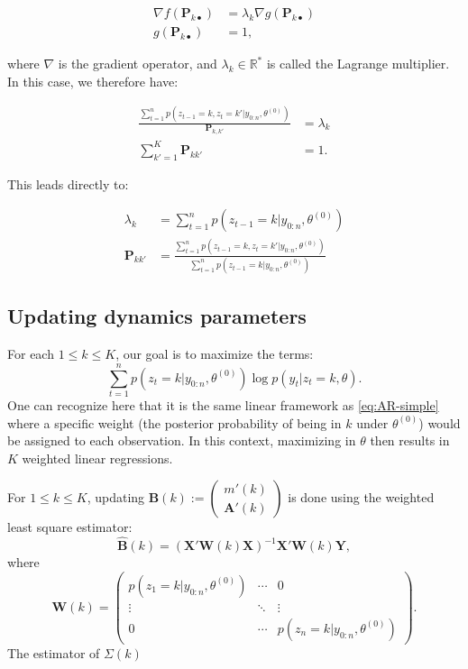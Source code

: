 \documentclass[]{book}
\begin{document}
\begin{align*}
\nabla f(\mathbf{P}_{k\bullet}) &= \lambda_k \nabla g(\mathbf{P}_{k\bullet})\\
g(\mathbf{P}_{k\bullet}) &= 1,
\end{align*}

where \(\nabla\) is the gradient operator, and
\(\lambda_k \in \mathbb{R}^*\) is called the Lagrange multiplier. In
this case, we therefore have:

\begin{align*}
\frac{\sum_{t = 1}^n p(z_{t-1} = k, z_{t} = k'\vert y_{0:n}, \theta^{(0)})}{\mathbf{P}_{k,k'}} &= \lambda_k \\
\sum_{k' = 1}^K{\mathbf{P}_{kk'}} &= 1.
\end{align*}

This leads directly to:

\begin{align*}
\lambda_k &= \sum_{t = 1}^n p(z_{t - 1} = k \vert y_{0:n}, \theta^{(0)}) \\
\mathbf{P}_{kk'} &= \frac{\sum_{t = 1}^n p(z_{t - 1} = k, z_{t} = k'\vert y_{0:n}, \theta^{(0)}) }{\sum_{t = 1}^n p(z_{t - 1} = k \vert y_{0:n}, \theta^{(0)})}
\end{align*}

\subsection*{Updating dynamics
parameters}\label{updating-dynamics-parameters}

For each \(1\leq k \leq K\), our goal is to maximize the terms:
\[\sum_{t = 1}^n p(z_t = k\vert y_{0:n}, \theta^{(0)}) \log p(y_{t} \vert z_{t} = k, \theta).\]
One can recognize here that it is the same linear framework as
\eqref{eq:AR-simple} where a specific weight (the posterior probability of
being in \(k\) under \(\theta^{(0)}\)) would be assigned to each
observation. In this context, maximizing in \(\theta\) then results in
\(K\) weighted linear regressions.

For \(1 \leq k\leq K\), updating
\(\mathbf{B}(k) := \begin{pmatrix} m'(k)\\ \mathbf{A}'(k) \end{pmatrix}\)
is done using the weighted least square estimator:
\[\widehat{\mathbf{B}}(k) = \left(\mathbf{X}'\mathbf{W}(k)\mathbf{X} \right)^{-1} \mathbf{X}'\mathbf{W}(k) \mathbf{Y},\]
where
\[\mathbf{W}(k) = \begin{pmatrix}p(z_1 = k\vert y_{0:n}, \theta^{(0)}) & \cdots & 0 \\
\vdots & \ddots & \vdots\\
0 & \cdots & p(z_{n} = k\vert y_{0:n}, \theta^{(0)})
\end{pmatrix}.\] The estimator of \(\Sigma(k)\)


\end{document}
